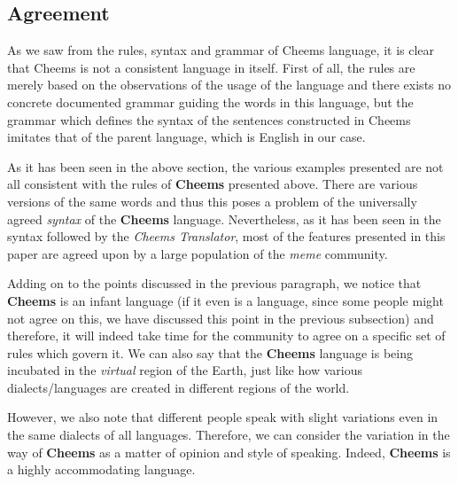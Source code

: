\def\DevnagVersion{2.17}\documentclass{article}
\begin{document}
\subsection{Agreement}
As we saw from the rules, syntax and grammar of Cheems language, it is clear that Cheems is not a consistent language in itself. First of all, the rules are merely based on the observations of the usage of the language and there exists no concrete documented grammar guiding the words in this language, but the grammar which defines the syntax of the sentences constructed in Cheems imitates that of the parent language, which is English in our case.\par
As it has been seen in the above section, the various examples presented are not all consistent with the rules of \textbf{Cheems} presented above. There are various versions of the same words and thus this poses a problem of the universally agreed \textit{syntax} of the \textbf{Cheems} language. Nevertheless, as it has been seen in the syntax followed by the \textit{Cheems Translator}, most of the features presented in this paper are agreed upon by a large population of the \textit{meme} community.\par
Adding on to the points discussed in the previous paragraph, we notice that \textbf{Cheems} is an infant language (if it even is a language, since some people might not agree on this, we have discussed this point in the previous subsection) and therefore, it will indeed take time for the community to agree on a specific set of rules which govern it. We can also say that the \textbf{Cheems} language is being incubated in the \textit{virtual} region of the Earth, just like how various dialects/languages are created in different regions of the world.\par
However, we also note that different people speak with slight variations even in the same dialects of all languages. Therefore, we can consider the variation in the way of \textbf{Cheems} as a matter of opinion and style of speaking. Indeed, \textbf{Cheems} is a highly accommodating language.
\end{document}
